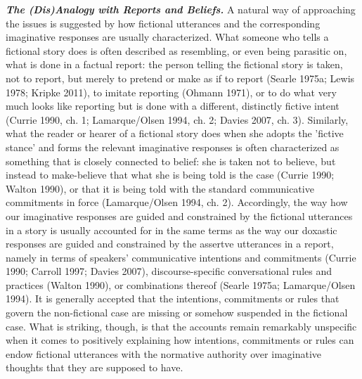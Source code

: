 \vspace{.2cm}
\noindent\textbf{\emph{The (Dis)Analogy with Reports and Beliefs.}} A natural way of approaching the issues is suggested by how fictional utterances and the corresponding imaginative responses are usually characterized. What someone who tells a fictional story does is often described as resembling, or even being parasitic on, what is done in a factual report: the person telling the fictional story is taken, not to report, but merely to pretend or make as if to report (Searle 1975a; Lewis 1978; Kripke 2011), to imitate reporting (Ohmann 1971), or to do what very much looks like reporting but is done with a different, distinctly fictive intent (Currie 1990, ch. 1; Lamarque/Olsen 1994, ch. 2; Davies 2007, ch. 3). Similarly, what the reader or hearer of a fictional story does when she adopts the 'fictive stance' and forms the relevant imaginative responses is often characterized as something that is closely connected to belief: she is taken not to believe, but instead to make-believe that what she is being told is the case (Currie 1990; Walton 1990), or that it is being told with the standard communicative commitments in force (Lamarque/Olsen 1994, ch. 2). Accordingly, the way how our imaginative responses are guided and constrained by the fictional utterances in a story is usually accounted for in the same terms as the way our doxastic responses are guided and constrained by the assertve utterances in a report, namely in terms of speakers' communicative intentions and commitments (Currie 1990; Carroll 1997; Davies 2007), discourse-specific conversational rules and practices (Walton 1990), or combinations thereof (Searle 1975a; Lamarque/Olsen 1994). It is generally accepted that the intentions, commitments or rules that govern the non-fictional case are missing or somehow suspended in the fictional case. What is striking, though, is that the accounts remain remarkably unspecific when it comes to positively explaining how intentions, commitments or rules can endow fictional utterances with the normative authority over imaginative thoughts that they are supposed to have.


